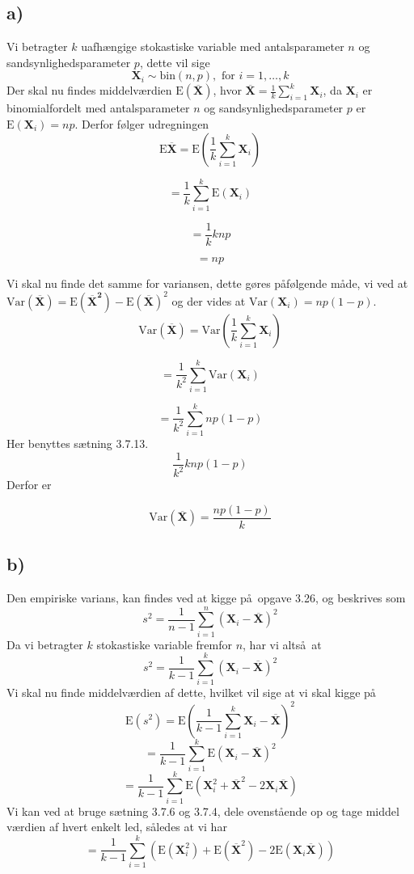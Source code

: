 {
\newcommand{\ud}{\, \mathrm{d}}
\newcommand{\mb}[1]{\mathbf{#1}}
\newcommand{\tr}[1]{\textrm{#1}}
\newcommand{\indep}{{\;\bot\!\!\!\!\!\!\bot\;}}

\newenvironment{nospace}%
{\noindent\ignorespaces}%
{\par\noindent%
  \ignorespacesafterend}
\subsection*{a)}
Vi betragter $k$ uafh\ae ngige stokastiske variable med antalsparameter $n$ og sandsynlighedsparameter $p$, dette vil sige
\[
\mb{X}_i \sim{ \tr{bin} \left( n,p \right) } , \tr{ for } i = 1,\dots,k
\]
Der skal nu findes middelv\ae rdien $\tr{E}(\overline{\mb{X}})$, hvor $\overline{\mb{X}} = \frac{1}{k} \sum_{i = 1}^k \mb{X}_i$, da $\mb{X}_i$ er binomialfordelt med antalsparameter $n$ og sandsynlighedsparameter $p$ er $\tr{E}(\mb{X}_i) = np$. Derfor f\o lger udregningen
\[
\tr{E}\mb{\overline{X}} = \tr{E} \left(\frac{1}{k}\sum_{i = 1}^k \mb{X}_i \right)
\]

\[
= \frac{1}{k}\sum_{i = 1}^k \tr{E}(\mb{X}_i)
\]

\[
= \frac{1}{k}k np
\]

\[
= np
\]

Vi skal nu finde det samme for variansen, dette g\o res p\aa f\o lgende m\aa de, vi ved at $\tr{Var}(\mb{\overline{X}}) = \tr{E}(\mb{\overline{X}^2}) - \tr{E}(\mb{\overline{X}})^2$ og der vides at $\tr{Var}(\mb{X}_i) = np(1-p)$.
\[
\tr{Var}(\mb{\overline{X}}) = \tr{Var}(\frac{1}{k} \sum_{i = 1}^k \mb{X}_i)
\]

\[
= \frac{1}{k^2} \sum_{i = 1}^k \tr{Var}(\mb{X}_i)
\]

\[
=\frac{1}{k^2} \sum_{i = 1}^k np(1-p)
\]
Her benyttes s\ae tning 3.7.13.
\[
\frac{1}{k^2} k np(1-p)
\]
Derfor er

\[
\tr{Var}(\mb{\overline{X}}) = \frac{np(1-p)}{k}
\]

\subsection*{b)}
Den empiriske varians, kan findes ved at kigge p\aa\ opgave 3.26, og beskrives som
\[
s^2 = \frac{1}{n-1}\sum_{i = 1}^{n}\left(\mb{X}_i - \mb{\overline{X}}\right)^2
\]
Da vi betragter $k$ stokastiske variable fremfor $n$, har vi alts\aa\ at
\[
s^2 = \frac{1}{k-1}\sum_{i = 1}^{k}\left(\mb{X}_i - \mb{\overline{X}}\right)^2
\]
Vi skal nu finde middelv\ae rdien af dette, hvilket vil sige at vi skal kigge p\aa
\[
\tr{E}(s^2) = \tr{E}\left( \frac{1}{k-1}\sum_{i = 1}^{k}\mb{X}_i - \mb{\overline{X}}\right)^2
\]
\[
= \frac{1}{k-1}\sum_{i = 1}^{k} \tr{E}\left(\mb{X}_i - \mb{\overline{X}} \right)^{2}
\]
\[
= \frac{1}{k-1}\sum_{i = 1}^{k} \tr{E}\left(\mb{X}_{i}^{2} + \mb{\overline{X}}^{2} - 2\mb{X}_i\mb{\overline{X}} \right)
\]
Vi kan ved at bruge s\ae tning 3.7.6 og 3.7.4, dele ovenst\aa ende op og tage middel v\ae rdien af hvert enkelt led, s\aa ledes at vi har
\[
= \frac{1}{k-1} \sum_{i = 1}^{k} \left( \tr{E} \left( \mb{X}_{i}^{2} \right) + \tr{E} \left( \mb{\overline{X}}^{2} \right) - 2 \tr{E} \left( \mb{X}_i \mb{\overline{X}} \right) \right)
\]

}
